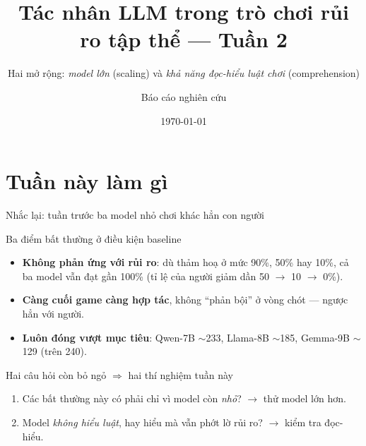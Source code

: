 \documentclass[aspectratio=169,11pt]{beamer}
\title{Tác nhân LLM trong trò chơi rủi ro tập thể --- Tuần 2}
\subtitle{Hai mở rộng: \emph{model lớn} (scaling) và \emph{khả năng đọc-hiểu luật chơi} (comprehension)}
\date{\today}
\author{Báo cáo nghiên cứu}
\begin{document}
\maketitle

\section{Tuần này làm gì}

\begin{frame}{Nhắc lại: tuần trước ba model nhỏ chơi khác hẳn con người}
  \small
  \begin{block}{Ba điểm bất thường ở điều kiện baseline}
    \begin{itemize}\setlength\itemsep{2pt}
      \item \textbf{Không phản ứng với rủi ro}: dù thảm hoạ ở mức 90\%, 50\% hay 10\%, cả ba model vẫn đạt gần 100\% (tỉ lệ của người giảm dần 50 $\to$ 10 $\to$ 0\%).
      \item \textbf{Càng cuối game càng hợp tác}, không ``phản bội'' ở vòng chót --- ngược hẳn với người.
      \item \textbf{Luôn đóng vượt mục tiêu}: Qwen-7B $\sim$233, Llama-8B $\sim$185, Gemma-9B $\sim$129 (trên 240).
    \end{itemize}
  \end{block}
  \begin{exampleblock}{Hai câu hỏi còn bỏ ngỏ $\Rightarrow$ hai thí nghiệm tuần này}
    \begin{enumerate}\setlength\itemsep{2pt}
      \item Các bất thường này có phải chỉ vì model còn \emph{nhỏ}? $\to$ thử \alert{model lớn hơn}.
      \item Model \emph{không hiểu luật}, hay hiểu mà vẫn phớt lờ rủi ro? $\to$ \alert{kiểm tra đọc-hiểu}.
    \end{enumerate}
  \end{exampleblock}
\end{frame}
\end{document}
